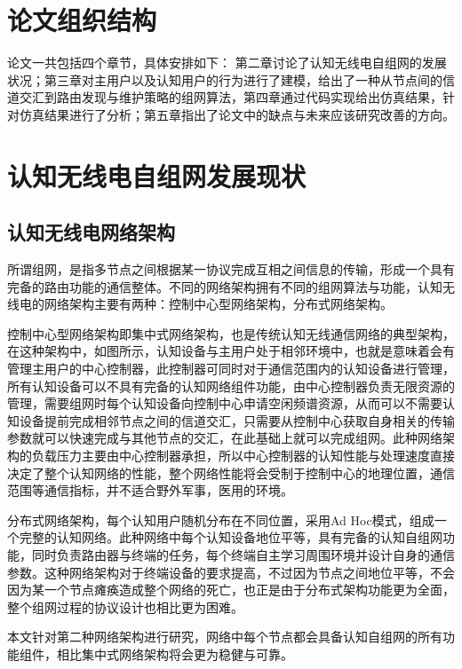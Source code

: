 \documentclass[a4paper,AutoFakeBold,oneside,12pt]{book}
\begin{document}
\section{论文组织结构}
  论文一共包括四个章节，具体安排如下：
  第二章讨论了认知无线电自组网的发展状况；第三章对主用户以及认知用户的行为进行了建模，给出了一种从节点间的信道交汇到路由发现与维护策略的组网算法，第四章通过代码实现给出仿真结果，针对仿真结果进行了分析；第五章指出了论文中的缺点与未来应该研究改善的方向。
\section{认知无线电自组网发展现状}
\subsection{认知无线电网络架构}
  所谓组网，是指多节点之间根据某一协议完成互相之间信息的传输，形成一个具有完备的路由功能的通信整体。不同的网络架构拥有不同的组网算法与功能，认知无线电的网络架构主要有两种：控制中心型网络架构，分布式网络架构。
  
  控制中心型网络架构即集中式网络架构，也是传统认知无线通信网络的典型架构，在这种架构中，如图所示，认知设备与主用户处于相邻环境中，也就是意味着会有管理主用户的中心控制器，此控制器可同时对于通信范围内的认知设备进行管理，所有认知设备可以不具有完备的认知网络组件功能，由中心控制器负责无限资源的管理，需要组网时每个认知设备向控制中心申请空闲频谱资源，从而可以不需要认知设备提前完成相邻节点之间的信道交汇，只需要从控制中心获取自身相关的传输参数就可以快速完成与其他节点的交汇，在此基础上就可以完成组网。此种网络架构的负载压力主要由中心控制器承担，所以中心控制器的认知性能与处理速度直接决定了整个认知网络的性能，整个网络性能将会受制于控制中心的地理位置，通信范围等通信指标，并不适合野外军事，医用的环境。


  分布式网络架构，每个认知用户随机分布在不同位置，采用Ad Hoc模式，组成一个完整的认知网络。此种网络中每个认知设备地位平等，具有完备的认知自组网功能，同时负责路由器与终端的任务，每个终端自主学习周围环境并设计自身的通信参数。这种网络架构对于终端设备的要求提高，不过因为节点之间地位平等，不会因为某一个节点瘫痪造成整个网络的死亡，也正是由于分布式架构功能更为全面，整个组网过程的协议设计也相比更为困难。


  本文针对第二种网络架构进行研究，网络中每个节点都会具备认知自组网的所有功能组件，相比集中式网络架构将会更为稳健与可靠。
\end{document}
